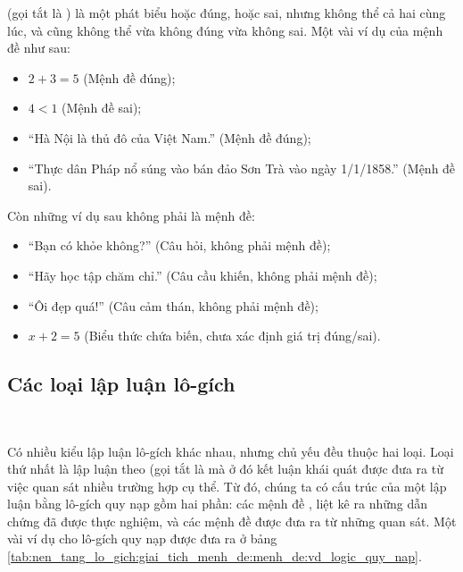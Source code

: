  (gọi tắt là ) là một phát biểu hoặc đúng, hoặc sai, nhưng không thể cả hai cùng lúc, và cũng không thể vừa không đúng vừa không sai. Một vài ví dụ của mệnh đề như sau:
\begin{itemize}
   \item $2 + 3 = 5$  \hfill (Mệnh đề đúng);
   \item $4 < 1$ \hfill (Mệnh đề sai);
   \item ``Hà Nội là thủ đô của Việt Nam.'' \hfill (Mệnh đề đúng);
   \item ``Thực dân Pháp nổ súng vào bán đảo Sơn Trà vào ngày 1/1/1858.'' \hfill (Mệnh đề sai).
\end{itemize}
Còn những ví dụ sau không phải là mệnh đề:
\begin{itemize}
   \item ``Bạn có khỏe không?'' \hfill (Câu hỏi, không phải mệnh đề);
   \item ``Hãy học tập chăm chỉ.'' \hfill (Câu cầu khiến, không phải mệnh đề);
   \item ``Ôi đẹp quá!'' \hfill (Câu cảm thán, không phải mệnh đề);
   \item $x + 2 = 5$ \hfill (Biểu thức chứa biến, chưa xác định giá trị đúng/sai).
\end{itemize}

\subsection{Các loại lập luận lô-gích}

\ %

Có nhiều kiểu lập luận lô-gích khác nhau, nhưng chủ yếu đều thuộc hai loại. Loại thứ nhất là lập luận theo  (gọi tắt là  mà ở đó kết luận khái quát được đưa ra từ việc quan sát nhiều trường hợp cụ thể. Từ đó, chúng ta có cấu trúc của một lập luận bằng lô-gích quy nạp gồm hai phần: các mệnh đề , liệt kê ra những dẫn chứng đã được thực nghiệm, và các mệnh đề  được đưa ra từ những quan sát. Một vài ví dụ cho lô-gích quy nạp được đưa ra ở bảng \ref{tab:nen_tang_lo_gich:giai_tich_menh_de:menh_de:vd_logic_quy_nap}.

